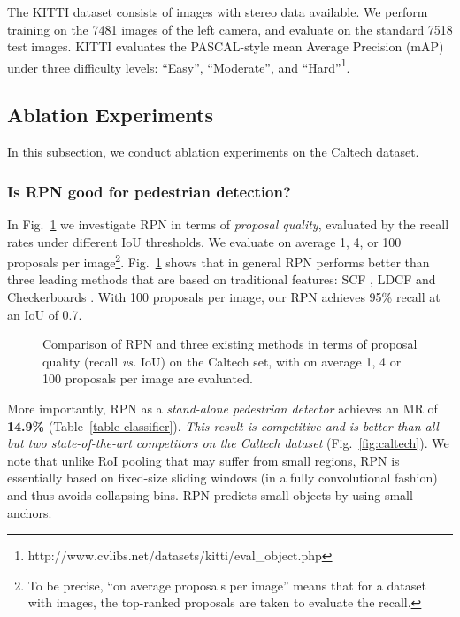 \documentclass[runningheads]{llncs}
\def\vs{\emph{vs. }}
\begin{document}
The KITTI dataset \cite{geiger2012kitti} consists of images with stereo data available. We perform training on the 7481 images of the left camera, and evaluate on the standard 7518 test images. 
KITTI evaluates the PASCAL-style mean Average Precision (mAP) under three difficulty levels: ``Easy'', ``Moderate'', and ``Hard''\footnote{http://www.cvlibs.net/datasets/kitti/eval\_object.php}.

\subsection{Ablation Experiments}

In this subsection, we conduct ablation experiments on the Caltech dataset.

\subsubsection{Is RPN good for pedestrian detection?}\hfill

In Fig.~\ref{fig:proposal} we investigate RPN in terms of \emph{proposal quality}, evaluated by the recall rates under different IoU thresholds. We evaluate on average 1, 4, or 100 proposals per image\footnote{To be precise, ``on average  proposals per image'' means that for a dataset with  images, the top-ranked  proposals are taken to evaluate the recall.}. Fig.~\ref{fig:proposal} shows that in general RPN performs better than three leading methods that are based on traditional features: SCF \cite{benenson2014ten}, LDCF \cite{nam2014local} and Checkerboards \cite{zhang2015filtered}.
With 100 proposals per image, our RPN achieves 95\% recall at an IoU of 0.7.

\begin{figure}[t] \centering
{}
\caption{Comparison of RPN and three existing methods in terms of proposal quality (recall \vs IoU) on the Caltech set, with on average 1, 4 or 100 proposals per image are evaluated.}
\label{fig:proposal}
\end{figure}

More importantly, RPN as a \emph{stand-alone pedestrian detector} achieves an MR of \textbf{14.9\%} (Table~\ref{table-classifier}). \emph{This result is competitive and is better than all but two state-of-the-art competitors on the Caltech dataset} (Fig.~\ref{fig:caltech}). We note that unlike RoI pooling that may suffer from small regions, RPN is essentially based on fixed-size sliding windows (in a fully convolutional fashion) and thus avoids collapsing bins. RPN predicts small objects by using small anchors.
\end{document}
